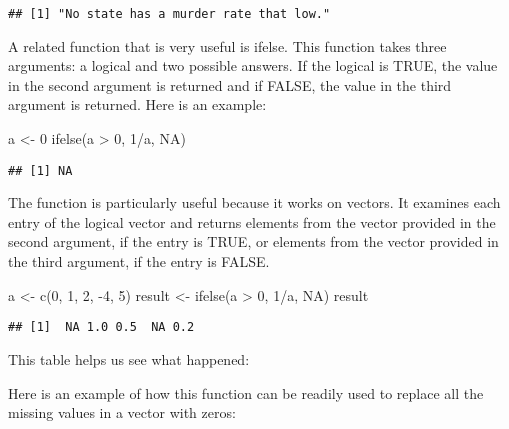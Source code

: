 \documentclass[
]{article}
\newenvironment{Shaded}{\begin{snugshade}}{\end{snugshade}}
\newcommand{\ConstantTok}[1]{\textcolor[rgb]{0.00,0.00,0.00}{#1}}
\newcommand{\DecValTok}[1]{\textcolor[rgb]{0.00,0.00,0.81}{#1}}
\newcommand{\FunctionTok}[1]{\textcolor[rgb]{0.00,0.00,0.00}{#1}}
\newcommand{\NormalTok}[1]{#1}
\newcommand{\OtherTok}[1]{\textcolor[rgb]{0.56,0.35,0.01}{#1}}
\newcommand{\SpecialCharTok}[1]{\textcolor[rgb]{0.00,0.00,0.00}{#1}}
\begin{document}
\begin{verbatim}
## [1] "No state has a murder rate that low."
\end{verbatim}

A related function that is very useful is ifelse. This function takes
three arguments: a logical and two possible answers. If the logical is
TRUE, the value in the second argument is returned and if FALSE, the
value in the third argument is returned. Here is an example:

\begin{Shaded}
\begin{Highlighting}[]
\NormalTok{a }\OtherTok{\textless{}{-}} \DecValTok{0}
\FunctionTok{ifelse}\NormalTok{(a }\SpecialCharTok{\textgreater{}} \DecValTok{0}\NormalTok{, }\DecValTok{1}\SpecialCharTok{/}\NormalTok{a, }\ConstantTok{NA}\NormalTok{)}
\end{Highlighting}
\end{Shaded}

\begin{verbatim}
## [1] NA
\end{verbatim}

The function is particularly useful because it works on vectors. It
examines each entry of the logical vector and returns elements from the
vector provided in the second argument, if the entry is TRUE, or
elements from the vector provided in the third argument, if the entry is
FALSE.

\begin{Shaded}
\begin{Highlighting}[]
\NormalTok{a }\OtherTok{\textless{}{-}} \FunctionTok{c}\NormalTok{(}\DecValTok{0}\NormalTok{, }\DecValTok{1}\NormalTok{, }\DecValTok{2}\NormalTok{, }\SpecialCharTok{{-}}\DecValTok{4}\NormalTok{, }\DecValTok{5}\NormalTok{)}
\NormalTok{result }\OtherTok{\textless{}{-}} \FunctionTok{ifelse}\NormalTok{(a }\SpecialCharTok{\textgreater{}} \DecValTok{0}\NormalTok{, }\DecValTok{1}\SpecialCharTok{/}\NormalTok{a, }\ConstantTok{NA}\NormalTok{)}
\NormalTok{result}
\end{Highlighting}
\end{Shaded}

\begin{verbatim}
## [1]  NA 1.0 0.5  NA 0.2
\end{verbatim}

This table helps us see what happened:

Here is an example of how this function can be readily used to replace
all the missing values in a vector with zeros:
\end{document}
